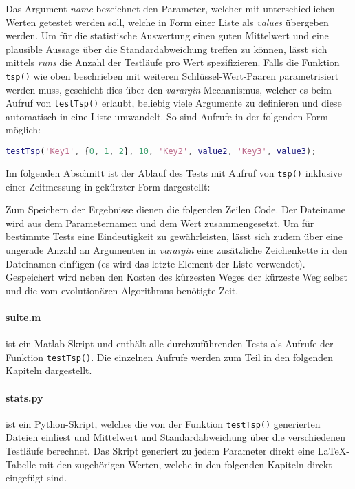 

\noindent Das Argument \emph{name} bezeichnet den Parameter, welcher mit
unterschiedlichen Werten getestet werden soll, welche in Form einer Liste als
\emph{values} übergeben werden.
Um für die statistische Auswertung einen guten Mittelwert und eine plausible
Aussage über die Standardabweichung treffen zu können, lässt sich mittels
\emph{runs} die Anzahl der Testläufe pro Wert spezifizieren.
Falls die Funktion {\tt tsp()} wie oben beschrieben mit weiteren Schlüssel-Wert-Paaren
parametrisiert werden muss, geschieht dies über den \emph{varargin}-Mechanismus,
welcher es beim Aufruf von {\tt testTsp()} erlaubt, beliebig viele Argumente zu
definieren und diese automatisch in eine Liste umwandelt. So sind Aufrufe in der
folgenden Form möglich:

\begin{lstlisting}[language=Matlab]
testTsp('Key1', {0, 1, 2}, 10, 'Key2', value2, 'Key3', value3);
\end{lstlisting}

\noindent Im folgenden Abschnitt ist der Ablauf des Tests mit Aufruf von
{\tt tsp()} inklusive einer Zeitmessung in gekürzter Form dargestellt:



\noindent Zum Speichern der Ergebnisse dienen die folgenden Zeilen Code.
Der Dateiname wird aus dem Parameternamen und dem Wert zusammengesetzt. Um für
bestimmte Tests eine Eindeutigkeit zu gewährleisten, lässt sich zudem über eine ungerade
Anzahl an Argumenten in \emph{varargin} eine zusätzliche Zeichenkette in den
Dateinamen einfügen (es wird das letzte Element der Liste verwendet).
Gespeichert wird neben den Kosten des kürzesten Weges der kürzeste Weg selbst
und die vom evolutionären Algorithmus benötigte Zeit.




\paragraph{suite.m} ist ein Matlab-Skript und enthält alle durchzuführenden Tests
als Aufrufe der Funktion {\tt testTsp()}. Die einzelnen Aufrufe werden zum Teil
in den folgenden Kapiteln dargestellt.


\paragraph{stats.py} ist ein Python-Skript, welches die von der Funktion
{\tt testTsp()} generierten Dateien einliest und Mittelwert und Standardabweichung
über die verschiedenen Testläufe berechnet.
Das Skript generiert zu jedem Parameter direkt eine \LaTeX-Tabelle mit den
zugehörigen Werten, welche in den folgenden Kapiteln direkt eingefügt sind.

